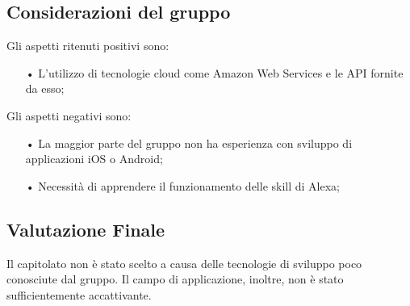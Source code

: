 \subsection{Considerazioni del gruppo}
Gli aspetti ritenuti positivi sono:
\begin{itemize}

\item[•] L'utilizzo di tecnologie cloud come Amazon Web Services e le API fornite da esso;

\end{itemize}

Gli aspetti negativi sono: 
\begin{itemize}

\item[•] La maggior parte del gruppo non ha esperienza con sviluppo di applicazioni iOS o Android;
\item[•] Necessità di apprendere il funzionamento delle skill di Alexa;

\end{itemize}

\subsection{Valutazione Finale}
Il capitolato non è stato scelto a causa delle tecnologie di sviluppo poco conosciute dal gruppo. Il campo di applicazione, inoltre, non è stato sufficientemente accattivante.
